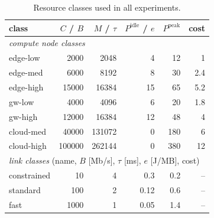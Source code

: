 \documentclass[pdflatex,sn-nature]{sn-jnl}
\theoremstyle{thmstyleone}
\theoremstyle{thmstyletwo}
\theoremstyle{thmstylethree}
\begin{document}
\begin{table}[!htbp]\centering
\caption{Resource classes used in all experiments.}\label{tabS10}
{\let\scriptsize\tiny\setlength{\tabcolsep}{2pt}\scriptsize
\begin{tabular}{lrrrrr}
\toprule
class & $C$ / $B$ & $M$ / $\tau$ & $P^{\mathrm{idle}}$ / $e$ & $P^{\mathrm{peak}}$ & cost \\
\midrule
\multicolumn{6}{l}{\emph{compute node classes}} \\
edge-low & 2000 & 2048 & 4 & 12 & 1 \\
edge-med & 6000 & 8192 & 8 & 30 & 2.4 \\
edge-high & 15000 & 16384 & 15 & 65 & 5.2 \\
gw-low & 4000 & 4096 & 6 & 20 & 1.8 \\
gw-high & 12000 & 16384 & 12 & 48 & 4 \\
cloud-med & 40000 & 131072 & 0 & 180 & 6 \\
cloud-high & 100000 & 262144 & 0 & 380 & 12 \\
\midrule \multicolumn{6}{l}{\emph{link classes} (name, $B$ [Mb/s], $\tau$ [ms], $e$ [J/MB], cost)} \\
constrained & 10 & 4 & 0.3 & 0.2 & -- \\
standard & 100 & 2 & 0.12 & 0.6 & -- \\
fast & 1000 & 1 & 0.05 & 1.4 & -- \\
\bottomrule
\end{tabular}}
\end{table}
\end{document}
